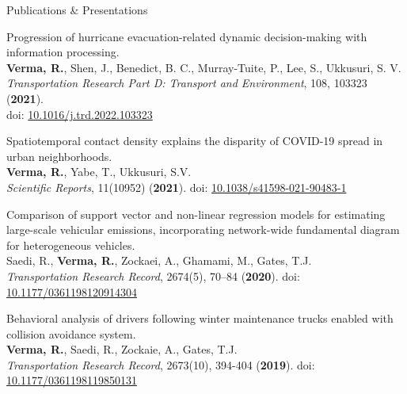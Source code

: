 \documentclass{CV} %
\begin{document}
\begin{rSection}{Publications \& Presentations}
\begin{etaremune}
        \item Progression of hurricane evacuation-related dynamic decision-making with information processing.
        \\ \textbf{Verma, R.}, Shen, J., Benedict, B. C., Murray-Tuite, P., Lee, S., Ukkusuri, S. V.
        \\ \textit{Transportation Research Part D: Transport and Environment}, 108, 103323 (\textbf{2021}).\\doi: \href{https://doi.org/10.1016/j.trd.2022.103323}{10.1016/j.trd.2022.103323}
        
        \item Spatiotemporal contact density explains the disparity of COVID-19 spread in urban neighborhoods.
        \\ \textbf{Verma, R.}, Yabe, T., Ukkusuri, S.V.
        \\ \textit{Scientific Reports}, 11(10952) (\textbf{2021}). doi: \href{https://www.nature.com/articles/s41598-021-90483-1}{10.1038/s41598-021-90483-1}
        
        \item Comparison of support vector and non-linear regression models for estimating large-scale vehicular emissions, incorporating network-wide fundamental diagram for heterogeneous vehicles.
        \\ Saedi, R., \textbf{Verma, R.}, Zockaei, A., Ghamami, M., Gates, T.J.
        \\ \textit{Transportation Research Record}, 2674(5), 70–84 (\textbf{2020}). doi: \href{https://journals.sagepub.com/doi/abs/10.1177/0361198120914304}{10.1177/0361198120914304}
        
        \item Behavioral analysis of drivers following winter maintenance trucks enabled with collision avoidance system.
        \\ \textbf{Verma, R.}, Saedi, R., Zockaie, A., Gates, T.J.
        \\ \textit{Transportation Research Record}, 2673(10), 394-404 (\textbf{2019}). doi: \href{https://journals.sagepub.com/doi/abs/10.1177/0361198119850131}{10.1177/0361198119850131}
    \end{etaremune}
    

\end{rSection}
\end{document}
